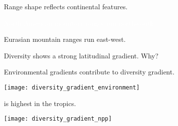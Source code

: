 \documentclass[t]{beamer}
\begin{document}
{
\begin{frame}[b,plain]{Range shape reflects continental features.}

\end{frame}
}

{
\begin{frame}[b,plain]{\textcolor{white}{North American mountain ranges run north-south.}}

\end{frame}
}

{
\begin{frame}[b,plain]{Eurasian mountain ranges run east-west.}

\end{frame}
}



{
\begin{frame}[b,plain]{Diversity shows a strong latitudinal gradient. Why?}

\end{frame}
}


%
%
%	
%	
%
%
%	
%	

\begin{frame}[t,plain]{Environmental gradients contribute to diversity gradient.}
	\begin{center}
		\texttt{[image: diversity\_gradient\_environment]}
	\end{center}
	
\end{frame}

\begin{frame}[t,plain]{ is highest in the tropics.}
	\begin{center}
		\texttt{[image: diversity\_gradient\_npp]}
	\end{center}
\end{frame}
\end{document}
